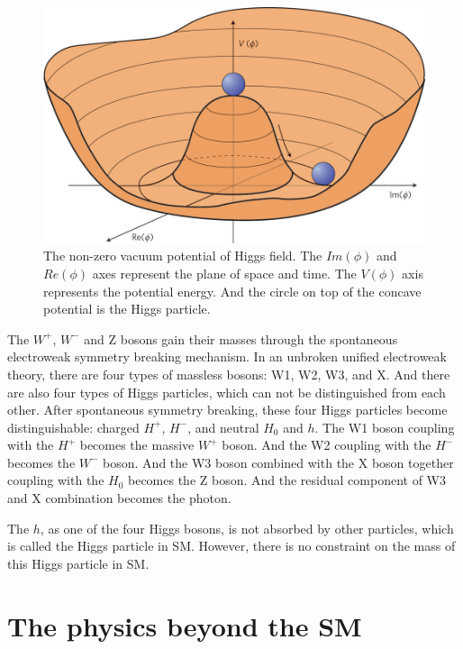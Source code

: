 \begin{figure}[!htbp]
\centering
\includegraphics[width=.7\textwidth]{figures/Higgs-potential.jpg}
\caption{The non-zero vacuum potential of Higgs field. The $Im(\phi)$ and $Re(\phi)$ axes represent
the plane of space and time. The $V(\phi)$ axis represents the potential energy. And the circle
on top of the concave potential is the Higgs particle.}
\label{fig:Higgs}
\end{figure}  


The $W^+$, $W^-$ and Z bosons gain their masses through the spontaneous electroweak symmetry breaking mechanism.
In an unbroken unified electroweak theory, there are four types of massless bosons: W1, W2, W3, and X. And there are also four types of Higgs particles, which can not be distinguished from each other. After spontaneous symmetry breaking, these four Higgs particles become distinguishable: charged $H^+$, $H^-$, and neutral $H_0$ and $h$. 
The W1 boson coupling with the $H^+$ becomes the massive $W^+$ boson.  And the W2 coupling
with the $H^-$ becomes the $W^-$ boson. And the W3 boson combined with the X boson together coupling with the $H_0$ becomes the Z boson. And the residual component of W3 and X combination becomes the photon. 

The $h$, as one of the four Higgs bosons, is not absorbed by other particles, which is called
the Higgs particle in SM.  However, there is no constraint on the mass of this Higgs particle in SM.



\section{The physics beyond the SM}

